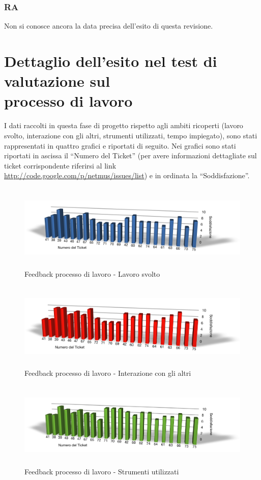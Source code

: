 \subsubsection*{RA}
Non si conosce ancora la data precisa dell'esito di questa revisione.

\section{Dettaglio dell'esito nel test di valutazione sul\\ processo di lavoro}
I dati raccolti in questa fase di progetto rispetto agli ambiti ricoperti
(lavoro svolto, interazione con gli altri, strumenti utilizzati, tempo
impiegato), sono stati rappresentati in quattro grafici e riportati di seguito.
Nei grafici sono stati riportati in ascissa il ``Numero del Ticket'' (per avere
informazioni dettagliate sul ticket corrispondente riferirsi al link
\url{http://code.google.com/p/netmus/issues/list}) e in ordinata la
``Soddisfazione''.

\begin{figure}[htbp]
  \centering
  \includegraphics[height=4.1cm]{img/PQ/LavoroSvolto.png}
\caption{Feedback processo di lavoro - Lavoro svolto}
\end{figure}

\begin{figure}[htbp]
  \centering
  \includegraphics[height=4.1cm]{img/PQ/InterazioneConGliAltri.png}
\caption{Feedback processo di lavoro - Interazione con gli altri}
\end{figure}

\begin{figure}[htbp]
  \centering
  \includegraphics[height=4.1cm]{img/PQ/Strumenti.png}
\caption{Feedback processo di lavoro - Strumenti utilizzati}
\end{figure}

